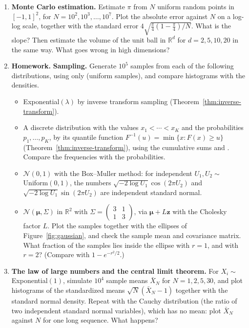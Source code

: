 \documentclass[11pt]{article}
\newcommand{\homework}{\textcolor{red!70!black}{\textbf{Homework.}}}
\newcommand{\py}[1]{\texttt{\detokenize{#1}}}
\theoremstyle{definition}
\theoremstyle{plain}
\theoremstyle{remark}
\begin{document}
\begin{enumerate}[label=\textbf{P\arabic*.}, leftmargin=*]
    \item \textbf{Monte Carlo estimation.} Estimate $\pi$ from $N$ uniform random points in $[-1, 1]^2$, for $N = 10^2, 10^3, \ldots, 10^7$. Plot the absolute error against $N$ on a log-log scale, together with the standard error $4\sqrt{\frac{\pi}{4}(1 - \frac{\pi}{4})/N}$. What is the slope? Then estimate the volume of the unit ball in $\mathbb{R}^d$ for $d = 2, 5, 10, 20$ in the same way. What goes wrong in high dimensions?

    \item \homework{} \textbf{Sampling.} Generate $10^5$ samples from each of the following distributions, using only \py{rng.random()} (uniform samples), and compare histograms with the densities.
    \begin{itemize}
        \item Exponential$(\lambda)$ by inverse transform sampling (Theorem~\ref{thm:inverse-transform}).
        \item A discrete distribution with the values $x_1 < \cdots < x_K$ and the probabilities $p_1, \ldots, p_K$, by its quantile function $F^{-1}(u) = \min\{x : F(x) \geq u\}$ (Theorem~\ref{thm:inverse-transform}), using the cumulative sums and \py{np.searchsorted}. Compare the frequencies with the probabilities.
        \item $\mathcal{N}(0, 1)$ with the Box--Muller method: for independent $U_1, U_2 \sim$ Uniform$(0, 1)$, the numbers $\sqrt{-2\log U_1}\cos(2\pi U_2)$ and $\sqrt{-2\log U_1}\sin(2\pi U_2)$ are independent standard normal.
        \item $\mathcal{N}(\boldsymbol{\mu}, \Sigma)$ in $\mathbb{R}^2$ with $\Sigma = \begin{pmatrix} 3 & 1 \\ 1 & 3 \end{pmatrix}$, via $\boldsymbol{\mu} + L\mathbf{z}$ with the Cholesky factor $L$. Plot the samples together with the ellipses of Figure~\ref{fig:gaussian}, and check the sample mean and covariance matrix. What fraction of the samples lies inside the ellipse with $r = 1$, and with $r = 2$? (Compare with $1 - e^{-r^2/2}$.)
    \end{itemize}

    \item \textbf{The law of large numbers and the central limit theorem.} For $X_i \sim$ Exponential$(1)$, simulate $10^4$ sample means $\bar X_N$ for $N = 1, 2, 5, 30$, and plot histograms of the standardized means $\sqrt{N}(\bar X_N - 1)$ together with the standard normal density. Repeat with the Cauchy distribution (the ratio of two independent standard normal variables), which has no mean: plot $\bar X_N$ against $N$ for one long sequence. What happens?


\end{enumerate}
\end{document}
